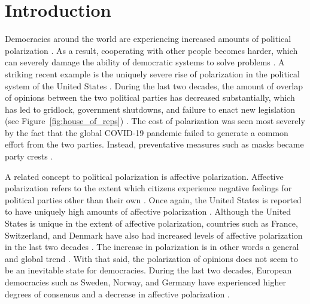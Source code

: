 \documentclass[11pt]{article}
\begin{document}
\newpage
\tableofcontents
\newpage

\part{Introduction}
\label{introduction}
Democracies around the world are experiencing increased amounts of political polarization \cite{boxell_cross-country_2020,mccoy_polarization_2018, somer_deja_2018}. 
As a result, cooperating with other people becomes harder, which can severely damage the ability of democratic systems to solve problems \cite{andris_rise_2015,levin_dynamics_2021,mccoy_polarization_2018}. 
A striking recent example is the uniquely severe rise of polarization in the political system of the United States \cite{dimock_america_2020}. 
During the last two decades, the amount of overlap of opinions between the two political parties has decreased substantially, which has led to gridlock, government shutdowns, and failure to enact new legislation (see Figure~\ref{fig:house_of_reps}) \cite{andris_rise_2015, pew_research_center_political_2014-1}. The cost of polarization was seen most severely by the fact that the global COVID-19 pandemic failed to generate a common effort from the two parties. Instead, preventative measures such as masks became party crests \cite{macy2021polarization}.

A related concept to political polarization is affective polarization. Affective polarization refers to the extent which citizens experience negative feelings for political parties other than their own \cite{boxell_cross-country_2020, iyengar_origins_2019}. 
Once again, the United States is reported to have uniquely high amounts of affective polarization \cite{boxell_cross-country_2020}. 
Although the United States is unique in the extent of affective polarization, countries such as France, Switzerland, and Denmark have also had increased levels of affective polarization in the last two decades \cite{boxell_cross-country_2020}. 
The increase in polarization is in other words a general and global trend \cite{mccoy_polarization_2018, somer_deja_2018, wilson_polarization_2020}. 
With that said, the polarization of opinions does not seem to be an inevitable state for democracies. 
During the last two decades, European democracies such as Sweden, Norway, and Germany have experienced higher degrees of consensus and a decrease in affective polarization \cite{boxell_cross-country_2020}. 
\end{document}
